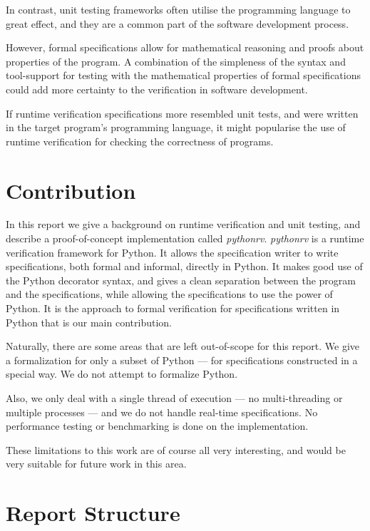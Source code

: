 \documentclass[a4paper,11pt]{kth-mag}
\theoremstyle{definition}
\begin{document}
In contrast, unit testing frameworks often utilise the programming language to
great effect, and they are a common part of the software development process.

However, formal specifications allow for mathematical reasoning and proofs
about properties of the program. A combination of the simpleness of the syntax
and tool-support for testing with the mathematical properties of formal
specifications could add more certainty to the verification in software
development.

If runtime verification specifications more resembled unit tests, and were
written in the target program's programming language, it might popularise the
use of runtime verification for checking the correctness of programs.


\section{Contribution}

In this report we give a background on runtime verification and unit testing,
and describe a proof-of-concept implementation called \textit{pythonrv}.
\textit{pythonrv} is a runtime verification framework for Python. It allows the
specification writer to write specifications, both formal and informal,
directly in Python. It makes good use of the Python decorator syntax, and gives
a clean separation between the program and the specifications, while allowing
the specifications to use the power of Python. It is the approach to formal
verification for specifications written in Python that is our main
contribution.

Naturally, there are some areas that are left out-of-scope for this report. We
give a formalization for only a subset of Python --- for specifications
constructed in a special way. We do not attempt to formalize Python.

Also, we only deal with a single thread of execution --- no multi-threading or
multiple processes --- and we do not handle real-time specifications. No
performance testing or benchmarking is done on the implementation.

These limitations to this work are of course all very interesting, and would be
very suitable for future work in this area.


\section{Report Structure}
\end{document}
